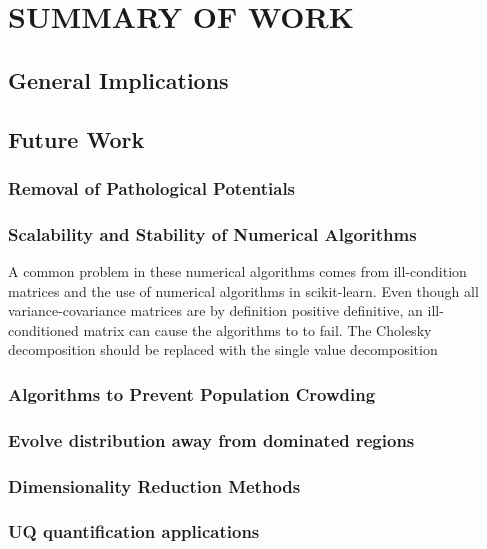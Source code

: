 \chapter{SUMMARY OF WORK}

\section{General Implications}

\section{Future Work}

\subsection{Removal of Pathological Potentials}

\subsection{Scalability and Stability of Numerical Algorithms}
A common problem in these numerical algorithms comes from ill-condition matrices and the use of numerical algorithms in scikit-learn.  Even though all variance-covariance matrices are by definition positive definitive, an ill-conditioned matrix can cause the algorithms to to fail.  The Cholesky decomposition should be replaced with the single value decomposition

\subsection{Algorithms to Prevent Population Crowding}

\subsection{Evolve distribution away from dominated regions}

\subsection{Dimensionality Reduction Methods}

\subsection{UQ quantification applications}


